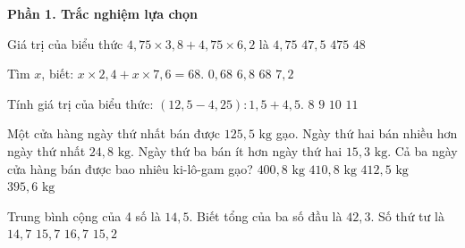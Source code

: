 \textbf{Phần 1. Trắc nghiệm lựa chọn}

\begin{ex} %
Giá trị của biểu thức $4{,}75 \times 3{,}8 + 4{,}75 \times 6{,}2$ là
\choice
{$4{,}75$}
{\True $47{,}5$}
{$475$}
{$48$}
\end{ex}

\begin{ex} %
Tìm $x$, biết: $x \times 2{,}4 + x \times 7{,}6 = 68$.
\choice
{$0{,}68$}
{\True $6{,}8$}
{$68$}
{$7{,}2$}
\end{ex}

\begin{ex} %
Tính giá trị của biểu thức: $(12{,}5 - 4{,}25) : 1{,}5 + 4{,}5$.
\choice
{$8$}
{$9$}
{\True $10$}
{$11$}
\end{ex}

\begin{ex} %
Một cửa hàng ngày thứ nhất bán được $125{,}5\text{ kg}$ gạo. Ngày thứ hai bán nhiều hơn ngày thứ nhất $24{,}8\text{ kg}$. Ngày thứ ba bán ít hơn ngày thứ hai $15{,}3\text{ kg}$. Cả ba ngày cửa hàng bán được bao nhiêu ki-lô-gam gạo?
\choice
{$400{,}8\text{ kg}$}
{\True $410{,}8\text{ kg}$}
{$412{,}5\text{ kg}$}
{$395{,}6\text{ kg}$}
\end{ex}

\begin{ex} %
Trung bình cộng của 4 số là $14{,}5$. Biết tổng của ba số đầu là $42{,}3$. Số thứ tư là
\choice
{$14{,}7$}
{\True $15{,}7$}
{$16{,}7$}
{$15{,}2$}
\end{ex}

